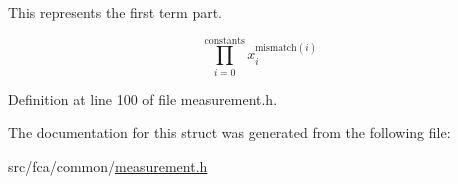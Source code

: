 \-This represents the first term part. 

\[ \prod_{i=0}^{\mathrm{constants}} x_i^{\mathrm{mismatch}(i)} \] 

\-Definition at line 100 of file measurement.\-h.



\-The documentation for this struct was generated from the following file\-:\begin{DoxyCompactItemize}
\item 
src/fca/common/\hyperlink{common_2measurement_8h}{measurement.\-h}\end{DoxyCompactItemize}
